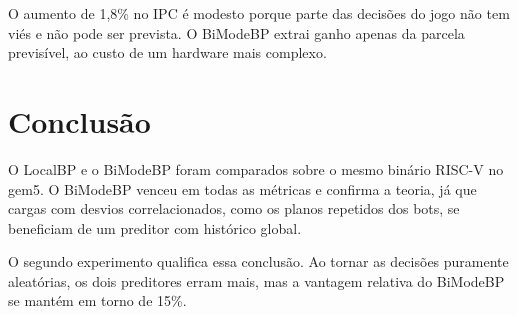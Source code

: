\documentclass[12pt]{article}
\begin{document}
O aumento de 1,8\% no IPC é modesto porque parte das decisões do jogo não
tem viés e não pode ser prevista. O BiModeBP extrai ganho apenas da parcela
previsível, ao custo de um hardware mais complexo.

\section{Conclusão}

O LocalBP e o BiModeBP foram comparados sobre o mesmo binário RISC-V no
gem5. O BiModeBP venceu em todas as métricas e confirma a teoria, já que
cargas com desvios correlacionados, como os planos repetidos dos bots, se
beneficiam de um preditor com histórico global.

O segundo experimento qualifica essa conclusão. Ao tornar as decisões
puramente aleatórias, os dois preditores erram mais, mas a vantagem relativa
do BiModeBP se mantém em torno de 15\%.



\end{document}
